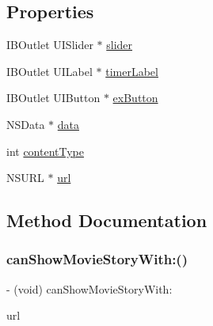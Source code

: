 \subsection*{Properties}
\begin{DoxyCompactItemize}
\item 
I\+B\+Outlet U\+I\+Slider $\ast$ \hyperlink{interface_content_finished_view_controller_abba582b538b4308dd10ad43a6aa5c81d}{slider}
\item 
I\+B\+Outlet U\+I\+Label $\ast$ \hyperlink{interface_content_finished_view_controller_a4b560790e244f4aad1b373708b04db1a}{timer\+Label}
\item 
I\+B\+Outlet U\+I\+Button $\ast$ \hyperlink{interface_content_finished_view_controller_a858859e0ef30a16027ab5422fce701bb}{ex\+Button}
\item 
N\+S\+Data $\ast$ \hyperlink{interface_content_finished_view_controller_a73e9036be325cea9a1a52466e92c1ccf}{data}
\item 
int \hyperlink{interface_content_finished_view_controller_a56bf067f38ac378c1252e4f2f4b34762}{content\+Type}
\item 
N\+S\+U\+RL $\ast$ \hyperlink{interface_content_finished_view_controller_a2b5223830df719daa6545c19aafc1f8a}{url}
\end{DoxyCompactItemize}


\subsection{Method Documentation}
\hypertarget{interface_content_finished_view_controller_a16b1e6c99452a56b19f06b00a5e80fd5}{}\label{interface_content_finished_view_controller_a16b1e6c99452a56b19f06b00a5e80fd5} 
\subsubsection{\texorpdfstring{can\+Show\+Movie\+Story\+With\+:()}{canShowMovieStoryWith:()}}
{\footnotesize\ttfamily -\/ (void) can\+Show\+Movie\+Story\+With\+: \begin{DoxyParamCaption}\item[{(N\+S\+U\+RL $\ast$)}]{url }\end{DoxyParamCaption}}

